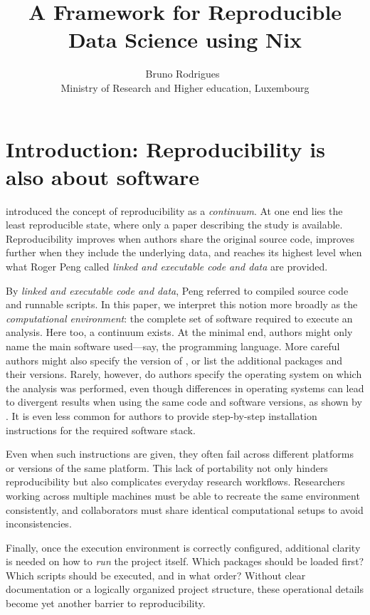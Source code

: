 \documentclass[
  article]{jss}
\author{Bruno Rodrigues~\orcidlink{0000-0002-3211-3689}\\Ministry of
Research and Higher education, Luxembourg}
\title{A Framework for Reproducible Data Science using Nix}
\begin{document}
\maketitle


\section{Introduction: Reproducibility is also about
software}\label{sec-intro}

\citet{peng2011} introduced the concept of reproducibility as a
\emph{continuum}. At one end lies the least reproducible state, where
only a paper describing the study is available. Reproducibility improves
when authors share the original source code, improves further when they
include the underlying data, and reaches its highest level when what
Roger Peng called \emph{linked and executable code and data} are
provided.

By \emph{linked and executable code and data}, Peng referred to compiled
source code and runnable scripts. In this paper, we interpret this
notion more broadly as the \emph{computational environment}: the
complete set of software required to execute an analysis. Here too, a
continuum exists. At the minimal end, authors might only name the main
software used---say, the  programming language. More careful
authors might also specify the version of , or list the
additional packages and their versions. Rarely, however, do authors
specify the operating system on which the analysis was performed, even
though differences in operating systems can lead to divergent results
when using the same code and software versions, as shown by
\citet{neupane2019}. It is even less common for authors to provide
step-by-step installation instructions for the required software stack.

Even when such instructions are given, they often fail across different
platforms or versions of the same platform. This lack of portability not
only hinders reproducibility but also complicates everyday research
workflows. Researchers working across multiple machines must be able to
recreate the same environment consistently, and collaborators must share
identical computational setups to avoid inconsistencies.

Finally, once the execution environment is correctly configured,
additional clarity is needed on how to \emph{run} the project itself.
Which packages should be loaded first? Which scripts should be executed,
and in what order? Without clear documentation or a logically organized
project structure, these operational details become yet another barrier
to reproducibility.
\end{document}
